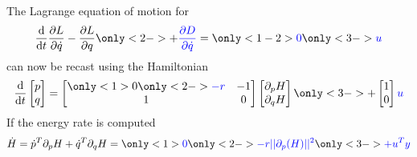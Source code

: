 \documentclass[aspectratio=169]{ISAE-Beamer}
\begin{document}
\begin{frame}

The Lagrange equation of motion for 
\[
\diff{}{t}\diffp{L}{\dot{q}} - \diffp{L}{q} \only<2->{ + \textcolor{blue}{\diffp{D}{\dot{q}}}} = \only<1-2>{\textcolor{blue}{0}} \only<3->{\textcolor{blue}{u}} 
\]
can now be recast using the Hamiltonian
\[\diff{}{t}
\begin{bmatrix}
p \\ q \\
\end{bmatrix} = 
\begin{bmatrix}
\only<1>{0} \only<2->{\textcolor{blue}{-r}} & -1 \\ 
1 & 0 \\
\end{bmatrix}
\begin{bmatrix}
\partial_p{H} \\ 
\partial_q{H} \\
\end{bmatrix} \only<3->{+ 
	\begin{bmatrix}
	1 \\ 0 \\
	\end{bmatrix} \textcolor{blue}{u}
}
\]
If the energy rate is computed
\[ \dot{H} = \dot{p}^T \partial_p{H} + \dot{q}^T \partial_q{H} = \only<1>{\textcolor{blue}{0}} \only<2->{\textcolor{blue}{-r ||\partial_p(H)||^2}} \only<3->{\textcolor{blue}{ + u^T y}} 
\]
\end{frame}
\end{document}
